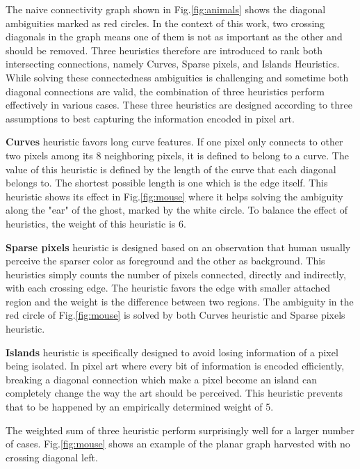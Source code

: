 \documentclass{article}
\begin{document}
The naive connectivity graph shown in Fig.\ref{fig:animals} shows the diagonal ambiguities marked as red circles. In the context of this work, two crossing diagonals in the graph means one of them is not as important as the other and should be removed. Three heuristics therefore are introduced to rank both intersecting connections, namely Curves, Sparse pixels, and Islands Heuristics. While solving these connectedness ambiguities is challenging and sometime both diagonal connections are valid, the combination of three heuristics perform effectively in various cases. These three heuristics are designed according to three assumptions to best capturing the information encoded in pixel art.

\textbf{Curves} heuristic favors long curve features. If one pixel only connects to other two pixels among its 8 neighboring pixels, it is defined to belong to a curve. The value of this heuristic is defined by the length of the curve that each diagonal belongs to. The shortest possible length is one which is the edge itself. This heuristic shows its effect in Fig.\ref{fig:mouse} where it helps solving the ambiguity along the "ear" of the ghost, marked by the white circle. To balance the effect of heuristics, the weight of this heuristic is 6.

\textbf{Sparse pixels} heuristic is designed based on an observation that human usually perceive the sparser color as foreground and the other as background. This heuristics simply counts the number of pixels connected, directly and indirectly, with each crossing edge. The heuristic favors the edge with smaller attached region and the weight is the difference between two regions. The ambiguity in the red circle of Fig.\ref{fig:mouse} is solved by both Curves heuristic and Sparse pixels heuristic.

\textbf{Islands} heuristic is specifically designed to avoid losing information of a pixel being isolated. In pixel art where every bit of information is encoded efficiently, breaking a diagonal connection which make a pixel become an island can completely change the way the art should be perceived. This heuristic prevents that to be happened by an empirically determined weight of 5.

The weighted sum of three heuristic perform surprisingly well for a larger number of cases. Fig.\ref{fig:mouse} shows an example of the planar graph harvested with no crossing diagonal left.
\end{document}
